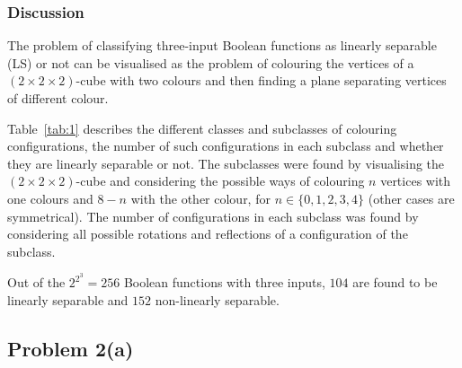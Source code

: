\documentclass[12pt,titlepage]{article}
\begin{document}
\subsubsection*{Discussion}
The problem of classifying three-input Boolean functions as linearly separable (LS) or not can be visualised as the problem of colouring the vertices of a $(2 \times 2 \times 2)$-cube with two colours and then finding a plane separating vertices of different colour.

Table~\ref{tab:1} describes the different classes and subclasses of colouring configurations, the number of such configurations in each subclass and whether they are linearly separable or not. The subclasses were found by visualising the $(2 \times 2 \times 2)$-cube and considering the possible ways of colouring $n$ vertices with one colours and $8-n$ with the other colour, for $n \in \lbrace0,1,2,3,4\rbrace$ (other cases are symmetrical). The number of configurations in each subclass was found by considering all possible rotations and reflections of a configuration of the subclass.

Out of the $2^{2^3} = 256$ Boolean functions with three inputs, $104$ are found to be linearly separable and $152$ non-linearly separable.
\clearpage

\subsection*{Problem 2(a)}
\end{document}
